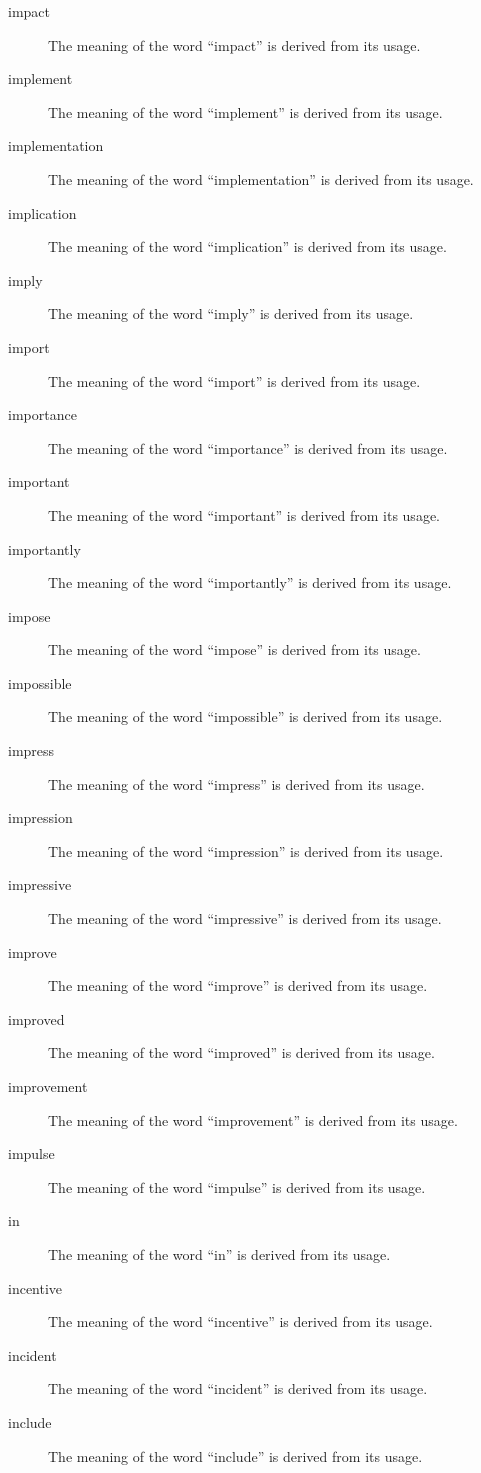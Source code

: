 \documentclass[12pt, letterpaper]{memoir}
\begin{document}
\begin{description}
\item[impact] The meaning of the word ``impact'' is derived from its usage.
\item[implement] The meaning of the word ``implement'' is derived from its usage.
\item[implementation] The meaning of the word ``implementation'' is derived from its usage.
\item[implication] The meaning of the word ``implication'' is derived from its usage.
\item[imply] The meaning of the word ``imply'' is derived from its usage.
\item[import] The meaning of the word ``import'' is derived from its usage.
\item[importance] The meaning of the word ``importance'' is derived from its usage.
\item[important] The meaning of the word ``important'' is derived from its usage.
\item[importantly] The meaning of the word ``importantly'' is derived from its usage.
\item[impose] The meaning of the word ``impose'' is derived from its usage.
\item[impossible] The meaning of the word ``impossible'' is derived from its usage.
\item[impress] The meaning of the word ``impress'' is derived from its usage.
\item[impression] The meaning of the word ``impression'' is derived from its usage.
\item[impressive] The meaning of the word ``impressive'' is derived from its usage.
\item[improve] The meaning of the word ``improve'' is derived from its usage.
\item[improved] The meaning of the word ``improved'' is derived from its usage.
\item[improvement] The meaning of the word ``improvement'' is derived from its usage.
\item[impulse] The meaning of the word ``impulse'' is derived from its usage.
\item[in] The meaning of the word ``in'' is derived from its usage.
\item[incentive] The meaning of the word ``incentive'' is derived from its usage.
\item[incident] The meaning of the word ``incident'' is derived from its usage.
\item[include] The meaning of the word ``include'' is derived from its usage.

\end{description}
\end{document}
